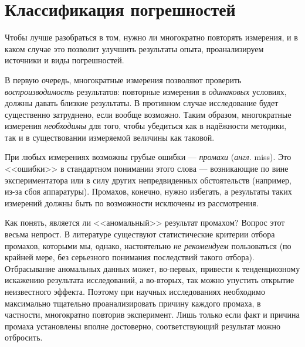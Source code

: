 \section{Классификация погрешностей}

Чтобы лучше разобраться в том, нужно ли многократно повторять измерения,
и в каком случае это позволит улучшить результаты опыта,
проанализируем источники и виды погрешностей.

В первую очередь, многократные измерения позволяют проверить
\emph{воспроизводимость} результатов: повторные измерения в \emph{одинаковых}
условиях, должны давать близкие результаты. В противном случае
исследование будет существенно затруднено, если вообще возможно.
Таким образом, многократные измерения \emph{необходимы} для того,
чтобы убедиться как в надёжности методики, так и в существовании измеряемой
величины как таковой.

При любых измерениях возможны грубые ошибки --- \emph{промахи}
(\emph{англ.} miss). Это <<ошибки>> в стандартном
понимании этого слова --- возникающие по вине экспериментатора
или в силу других непредвиденных обстоятельств (например, из-за сбоя
аппаратуры). Промахов, конечно, нужно избегать, а результаты таких
измерений должны быть по возможности исключены из рассмотрения.


Как понять, является ли <<аномальный>> результат промахом? Вопрос этот весьма
непрост. В литературе существуют статистические
критерии отбора промахов, которыми мы, однако, настоятельно \emph{не рекомендуем}
пользоваться (по крайней мере, без серьезного понимания последствий
такого отбора). Отбрасывание аномальных данных может, во-первых, привести
к тенденциозному искажению результата исследований, а во-вторых, так
можно упустить открытие неизвестного эффекта. Поэтому при научных
исследованиях необходимо максимально тщательно проанализировать причину
каждого промаха, в частности, многократно повторив эксперимент. Лишь
только если факт и причина промаха установлены вполне достоверно,
соответствующий результат можно отбросить.

